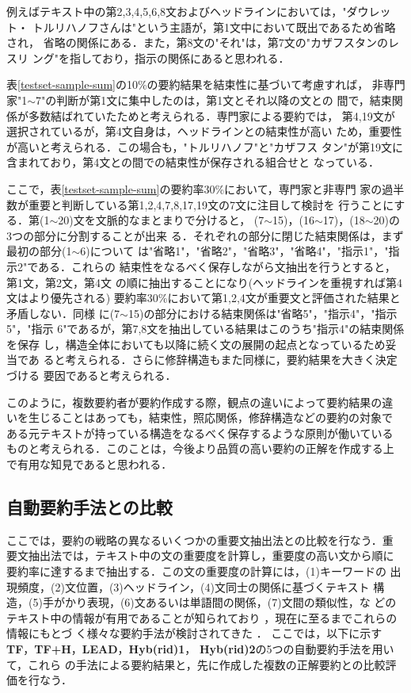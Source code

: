 例えばテキスト中の第2,3,4,5,6,8文およびヘッドラインにおいては，"ダウレット・
トルリハノフさんは"という主語が，第1文中において既出であるため省略され，
省略の関係にある．また，第8文の"それ"は，第7文の"カザフスタンのレスリ
ング"を指しており，指示の関係にあると思われる．

表\ref{testset-sample-sum}の10\%の要約結果を結束性に基づいて考慮すれば，
非専門家"1$\sim$7"の判断が第1文に集中したのは，第1文とそれ以降の文との
間で，結束関係が多数結ばれていたためと考えられる．専門家による要約では，
第4,19文が選択されているが，第4文自身は，ヘッドラインとの結束性が高い
ため，重要性が高いと考えられる．この場合も，"トルリハノフ"と"カザフス
タン"が第19文に含まれており，第4文との間での結束性が保存される組合せと
なっている．

ここで，表\ref{testset-sample-sum}の要約率30\%において，専門家と非専門
家の過半数が重要と判断している第1,2,4,7,8,17,19文の7文に注目して検討を
行うことにする．第(1$\sim$20)文を文脈的なまとまりで分けると，
(7$\sim$15)，(16$\sim$17)，(18$\sim$20)の3つの部分に分割することが出来
る．それぞれの部分に閉じた結束関係は，まず最初の部分(1$\sim$6)について
は"省略1"，"省略2"，"省略3"，"省略4"，"指示1"，"指示2"である．これらの
結束性をなるべく保存しながら文抽出を行うとすると，第1文，第2文，第4文
の順に抽出することになり(ヘッドラインを重視すれば第4文はより優先される)
要約率30\%において第1,2,4文が重要文と評価された結果と矛盾しない．同様
に(7$\sim$15)の部分における結束関係は"省略5"，"指示4"，"指示5"，"指示
6"であるが，第7,8文を抽出している結果はこのうち"指示4"の結束関係を保存
し，構造全体においても以降に続く文の展開の起点となっているため妥当であ
ると考えられる．さらに修辞構造もまた同様に，要約結果を大きく決定づける
要因であると考えられる\cite{D.Marcu.97}．

このように，複数要約者が要約作成する際，観点の違いによって要約結果の違
いを生じることはあっても，結束性，照応関係，修辞構造などの要約の対象で
ある元テキストが持っている構造をなるべく保存するような原則が働いている
ものと考えられる．このことは，今後より品質の高い要約の正解を作成する上
で有用な知見であると思われる．


\subsection{自動要約手法との比較}

ここでは，要約の戦略の異なるいくつかの重要文抽出法との比較を行なう．重
要文抽出法では，テキスト中の文の重要度を計算し，重要度の高い文から順に
要約率に達するまで抽出する．この文の重要度の計算には，(1)キーワードの
出現頻度，(2)文位置，(3)ヘッドライン，(4)文同士の関係に基づくテキスト
構造，(5)手がかり表現，(6)文あるいは単語間の関係，(7)文間の類似性，な
どのテキスト中の情報が有用であることが知られており
\cite{C.D.Paice.90,M.Okumura.99J}，現在に至るまでこれらの情報にもとづ
く様々な要約手法が検討されてきた
\cite{H.P.Edmundson.69,C.Aone.98,C.Nobata.01J,T.Yoshimi.99J,M.Utiyama.00J}．
ここでは，以下に示す{\bf TF}，{\bf TF+H}，{\bf LEAD}，{\bf Hyb(rid)1}，
{\bf Hyb(rid)2}の5つの自動要約手法\cite{K.Ishikawa.01}を用いて，これら
の手法による要約結果と，先に作成した複数の正解要約との比較評価を行なう．

